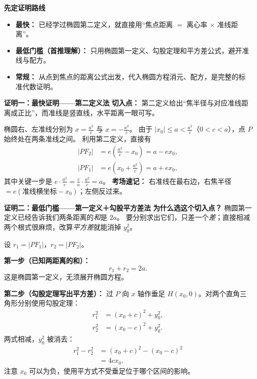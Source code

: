\begin{proofbox}
\textbf{\textcolor{CProof}{先定证明路线}}
\begin{itemize}[leftmargin=*, itemsep=0.3em, topsep=0.3em]
 \item \textbf{最快：} 已经学过椭圆第二定义，就直接用“焦点距离 $=$ 离心率 $\times$ 准线距离”。
 \item \textbf{最低门槛（首推理解）：} 只用椭圆第一定义、勾股定理和平方差公式，避开准线与配方。
 \item \textbf{常规：} 从点到焦点的距离公式出发，代入椭圆方程消元、配方，是完整的标准代数证明。
\end{itemize}

\medskip
\textbf{\textcolor{CProof}{证明一：最快证明——第二定义法}}
\textbf{切入点：} 第二定义给出“焦半径与对应准线距离成正比”，而准线是竖直线，水平距离一眼可写。

椭圆右、左准线分别为 $x=\frac{a^2}{c}$ 与 $x=-\frac{a^2}{c}$。
由于 $|x_0|\le a<\frac{a^2}{c}$（$0<c<a$），点 $P$ 始终处在两条准线之间。
利用第二定义，直接有
\[
 \begin{aligned}
 |PF_2|&=e\left(\frac{a^2}{c}-x_0\right)=a-ex_0,\\
 |PF_1|&=e\left(x_0+\frac{a^2}{c}\right)=a+ex_0,
 \end{aligned}
\]
其中关键一步是 $e\cdot\frac{a^2}{c}=\frac ca\cdot\frac{a^2}{c}=a$。
\textbf{考场速记：} 右准线在最右边，右焦半径 $=e(\text{准线横坐标}-x_0)$；左侧反过来。

\medskip
\textbf{\textcolor{CProof}{证明二：最低门槛——第一定义＋勾股平方差法}}
\textbf{为什么选这个切入点？} 椭圆第一定义已经告诉我们两条距离的\emph{和}是 $2a$。
要分别求出它们，只差一个\emph{差}；直接相减两个根式很麻烦，改算\emph{平方差}就能消掉 $y_0^2$。

设 $r_1=|PF_1|$，$r_2=|PF_2|$。

\textbf{第一步（已知两距离的和）：}
\[
 r_1+r_2=2a.
\]
这是椭圆第一定义，无须展开椭圆方程。

\textbf{第二步（勾股定理写出平方差）：}
过 $P$ 向 $x$ 轴作垂足 $H(x_0,0)$。对两个直角三角形分别使用勾股定理：
\[
 \begin{aligned}
 r_1^2&=(x_0+c)^2+y_0^2,\\
 r_2^2&=(x_0-c)^2+y_0^2.
 \end{aligned}
\]
两式相减，$y_0^2$ 被消去：
\[
 \begin{aligned}
 r_1^2-r_2^2
 &=(x_0+c)^2-(x_0-c)^2\\
 &=4cx_0.
 \end{aligned}
\]
注意 $x_0$ 可以为负，使用平方式不受垂足位于哪个区间的影响。


\end{proofbox}

